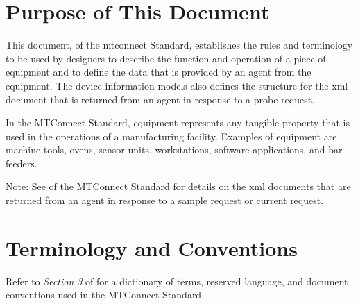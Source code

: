 \section{Purpose of This Document}

This document,  of the \gls{mtconnect}  Standard, establishes the rules and terminology to be used by designers to describe the function and operation of a piece of equipment and to define the data that is provided by an \gls{agent} from the equipment.  The \glspl{device information model}  also defines the structure for the \gls{xml} document that is returned from an \gls{agent} in response to a \gls{probe request}. 

In the MTConnect Standard, equipment represents any tangible property that is used in the operations of a manufacturing facility.  Examples of equipment are machine tools, ovens, sensor units, workstations, software applications, and bar feeders. 

\begin{note}
Note: See  of the MTConnect Standard for details on the \gls{xml} documents that are returned from an \gls{agent} in response to a \gls{sample request} or \gls{current request}.

\end{note}

\section{Terminology and Conventions}
Refer to \textit{Section 3} of  for a dictionary of terms, reserved language, and document conventions used in the MTConnect Standard.

\printglossary

\printacronyms  

\printbibliography[title=MTConnect References,keyword=MTC]

\printbibliography[title=Other References,notkeyword=MTC]